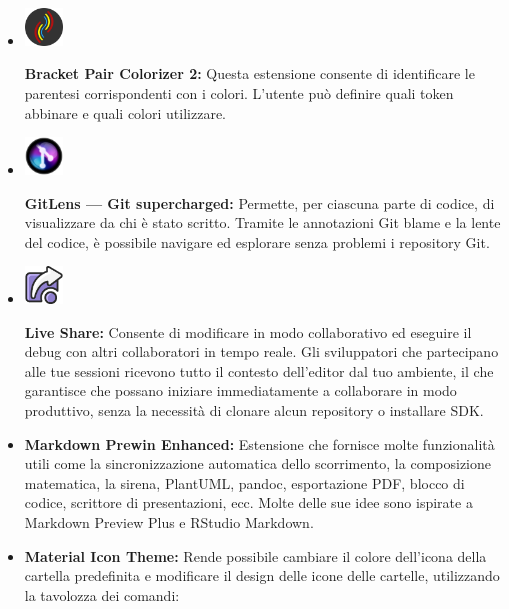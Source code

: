 \begin{itemize}
\item
\begin{minipage}{0.1\textwidth}
\includegraphics[width=1cm] {images/BracketPair.png}
\end{minipage}
\textbf{Bracket Pair Colorizer 2:} Questa estensione consente di identificare le parentesi corrispondenti con i colori. L'utente può definire quali token abbinare e quali colori utilizzare.
\item
\begin{minipage}{0.1\textwidth}
\includegraphics[width=1cm] {images/GitLens.jpg}
\end{minipage}
\textbf{GitLens — Git supercharged:} Permette, per ciascuna parte di codice, di visualizzare da chi è stato scritto. Tramite le annotazioni Git blame e la lente del codice, è possibile navigare ed esplorare senza problemi i repository Git.
\item
\begin{minipage}{0.1\textwidth}
\includegraphics[width=1cm] {images/LiveShare.png}
\end{minipage}
\textbf{Live Share:} Consente di modificare in modo collaborativo ed eseguire il debug con altri collaboratori in tempo reale. Gli sviluppatori che partecipano alle tue sessioni ricevono tutto il contesto dell'editor dal tuo ambiente, il che garantisce che possano iniziare immediatamente a collaborare in modo produttivo, senza la necessità di clonare alcun repository o installare SDK.
\item
\textbf{Markdown Prewin Enhanced:} Estensione che fornisce molte funzionalità utili come la sincronizzazione automatica dello scorrimento, la composizione matematica, la sirena, PlantUML, pandoc, esportazione PDF, blocco di codice, scrittore di presentazioni, ecc. Molte delle sue idee sono ispirate a Markdown Preview Plus e RStudio Markdown.
\item
\textbf{Material Icon Theme:} Rende possibile cambiare il colore dell'icona della cartella predefinita e modificare il design delle icone delle cartelle, utilizzando la tavolozza dei comandi:

\end{itemize}
